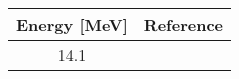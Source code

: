 \begin{tabular}{c c}
    \toprule
    \bf{Energy [MeV]} & \bf{Reference} \\
    \midrule
    14.1 & \cite{Meier1969}\\
    \bottomrule
\end{tabular}
